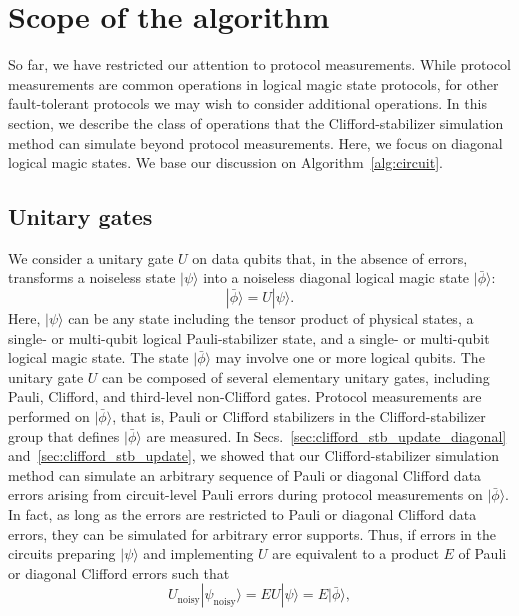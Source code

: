 \documentclass[
 reprint,
 amsmath,amssymb,
 pra,superscriptaddress, nofootinbib
]{revtex4-2}
\theoremstyle{definition}
\theoremstyle{plain}
\begin{document}
\section{Scope of the algorithm}\label{sec:scope}
So far, we have restricted our attention to protocol measurements. While protocol measurements are common operations in logical magic state protocols, for other fault-tolerant protocols we may wish to consider additional operations. In this section, we describe the class of operations that the Clifford-stabilizer simulation method can simulate beyond protocol measurements.
Here, we focus on diagonal logical magic states.
We base our discussion on Algorithm~\ref{alg:circuit}.

\subsection{Unitary gates}
We consider a unitary gate $U$ on data qubits that, in the absence of errors, transforms a noiseless state $|\psi\rangle$ into a noiseless diagonal logical magic state $|\bar{\phi}\rangle$:
\begin{equation}
    |\bar{\phi}\rangle=U|\psi\rangle.
\end{equation}
Here, $|\psi\rangle$ can be any state including the tensor product of physical states, a single- or multi-qubit logical Pauli-stabilizer state, and a single- or multi-qubit logical magic state.
The state $|\bar{\phi}\rangle$ may involve one or more logical qubits.
The unitary gate $U$ can be composed of several elementary unitary gates, including Pauli, Clifford, and third-level non-Clifford gates.
Protocol measurements are performed on $|\bar{\phi}\rangle$, that is, Pauli or Clifford stabilizers in the Clifford-stabilizer group that defines $|\bar{\phi}\rangle$ are measured. 
In Secs.~\ref{sec:clifford_stb_update_diagonal} and~\ref{sec:clifford_stb_update}, we showed that our Clifford-stabilizer simulation method can simulate an arbitrary sequence of Pauli or diagonal Clifford data errors arising from circuit-level Pauli errors during protocol measurements on $|\bar{\phi}\rangle$.
In fact, as long as the errors are restricted to Pauli or diagonal Clifford data errors, they can be simulated for arbitrary error supports.
Thus, if errors in the circuits preparing $|\psi\rangle$ and implementing $U$ are equivalent to a product $E$ of Pauli or diagonal Clifford errors such that 
\begin{equation}U_{\mathrm{noisy}}|\psi_{\mathrm{noisy}}\rangle=EU|\psi\rangle=E|\bar{\phi}\rangle, 
    \label{eq:scope_error_condition}
\end{equation}
\end{document}
